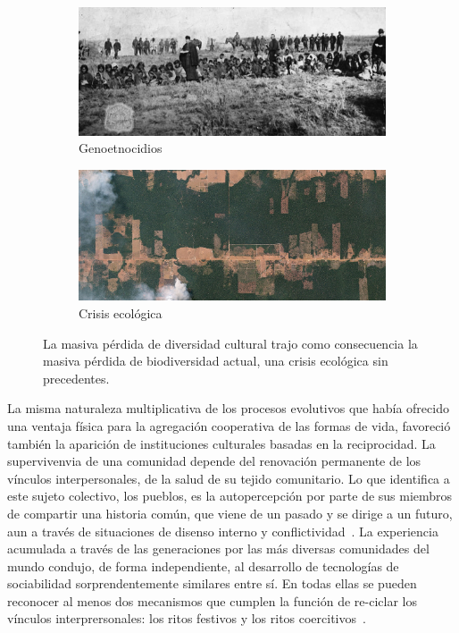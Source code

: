 \documentclass[a4paper,10pt]{book}
\begin{document}
\begin{figure}[ht!]
    \centering
    \begin{subfigure}[b]{0.48\textwidth}
    \includegraphics[width=\linewidth]{static/genocidio_patagonia}
    \caption{Genoetnocidios}
    \label{fig:genocidio_patagonia}
    \end{subfigure}
    \begin{subfigure}[b]{0.47\textwidth}
    \includegraphics[width=\linewidth]{static/deforestation-brazil}
    \caption{Crisis ecológica}
    \label{fig:deforestation-brazil}
    \end{subfigure}
    \caption{
    La masiva pérdida de diversidad cultural trajo como consecuencia la masiva pérdida de biodiversidad actual, una crisis ecológica sin precedentes.
    }
    \label{fig:cultural-lose}
\end{figure}

La misma naturaleza multiplicativa de los procesos evolutivos que había ofrecido una ventaja física para la agregación cooperativa de las formas de vida, favoreció también la aparición de instituciones culturales basadas en la reciprocidad.
La supervivenvia de una comunidad depende del renovación permanente de los vínculos interpersonales, de la salud de su tejido comunitario.
Lo que identifica a este sujeto colectivo, los pueblos, es la autopercepción por parte de sus miembros de compartir una historia común, que viene de un pasado y se dirige a un futuro, aun a través de situaciones de disenso interno y conflictividad~\cite{segato2016-guerraContraLasMujeres}.
La experiencia acumulada a través de las generaciones por las más diversas comunidades del mundo condujo, de forma independiente, al desarrollo de tecnologías de sociabilidad sorprendentemente similares entre sí.
En todas ellas se pueden reconocer al menos dos mecanismos que cumplen la función de re-ciclar los v\'inculos interprersonales: los ritos festivos y los ritos coercitivos~\cite{segato2016-guerraContraLasMujeres}.
\end{document}
